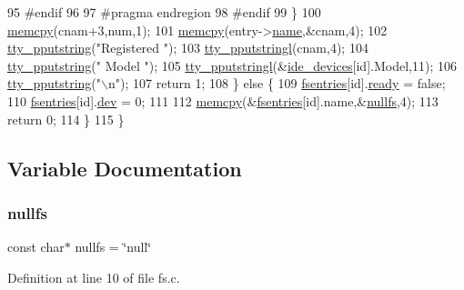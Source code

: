 \begin{DoxyCode}
95 \textcolor{preprocessor}{            #endif}
96 
97 \textcolor{preprocessor}{            #pragma endregion}
98 \textcolor{preprocessor}{            #endif}
99         \}
100         \hyperlink{a00131_a370712322c794e949c996946f2283ea8_a370712322c794e949c996946f2283ea8}{memcpy}(cnam+3,num,1);
101         \hyperlink{a00131_a370712322c794e949c996946f2283ea8_a370712322c794e949c996946f2283ea8}{memcpy}(entry->\hyperlink{a00272_a9c5a4f5b02eb2c9e9e797f79dc99028a_a9c5a4f5b02eb2c9e9e797f79dc99028a}{name},&cnam,4);
102         \hyperlink{a00179_ade960b1320324706aac6c00cc6b1b2fe_ade960b1320324706aac6c00cc6b1b2fe}{tty\_pputstring}(\textcolor{stringliteral}{"Registered "});
103         \hyperlink{a00179_abaf93f9e56ddb7b10462070f59e534e4_abaf93f9e56ddb7b10462070f59e534e4}{tty\_pputstringl}(cnam,4);
104         \hyperlink{a00179_ade960b1320324706aac6c00cc6b1b2fe_ade960b1320324706aac6c00cc6b1b2fe}{tty\_pputstring}(\textcolor{stringliteral}{" Model "});
105         \hyperlink{a00179_abaf93f9e56ddb7b10462070f59e534e4_abaf93f9e56ddb7b10462070f59e534e4}{tty\_pputstringl}(&\hyperlink{a00035_ab97a828ed4839b575dc382e2bf826e87_ab97a828ed4839b575dc382e2bf826e87}{ide\_devices}[\textcolor{keywordtype}{id}].Model,11);
106         \hyperlink{a00179_ade960b1320324706aac6c00cc6b1b2fe_ade960b1320324706aac6c00cc6b1b2fe}{tty\_pputstring}(\textcolor{stringliteral}{"\(\backslash\)n"});
107         \textcolor{keywordflow}{return} 1;
108     \} \textcolor{keywordflow}{else} \{
109         \hyperlink{a00152_a6b46131164b26e476762930c9aae4319_a6b46131164b26e476762930c9aae4319}{fsentries}[id].\hyperlink{a00272_a284522ed97fe1eeebd0fcc039b2ea00a_a284522ed97fe1eeebd0fcc039b2ea00a}{ready} = \textcolor{keyword}{false};
110         \hyperlink{a00152_a6b46131164b26e476762930c9aae4319_a6b46131164b26e476762930c9aae4319}{fsentries}[id].\hyperlink{a00272_aaea66ea744fa50f1c54666033884d8d2_aaea66ea744fa50f1c54666033884d8d2}{dev} = 0;
111 
112         \hyperlink{a00131_a370712322c794e949c996946f2283ea8_a370712322c794e949c996946f2283ea8}{memcpy}(&\hyperlink{a00152_a6b46131164b26e476762930c9aae4319_a6b46131164b26e476762930c9aae4319}{fsentries}[\textcolor{keywordtype}{id}].name,&\hyperlink{a00149_a36265ac74fd925405e1179e799961f1e_a36265ac74fd925405e1179e799961f1e}{nullfs},4);
113         \textcolor{keywordflow}{return} 0;
114     \} 
115 \}
\end{DoxyCode}


\subsection{Variable Documentation}
\mbox{\label{a00149_a36265ac74fd925405e1179e799961f1e_a36265ac74fd925405e1179e799961f1e}} 
\subsubsection{\texorpdfstring{nullfs}{nullfs}}
{\footnotesize\ttfamily const char$\ast$ nullfs = \char`\"{}null\char`\"{}}



Definition at line 10 of file fs.\+c.

